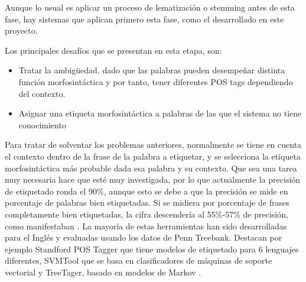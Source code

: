 Aunque lo usual es aplicar un proceso de lematización o stemming antes de esta fase, hay sistemas que aplican primero esta fase, como el desarrollado en este proyecto.\newline

Los principales desafíos que se presentan en esta etapa, son: 
\begin{itemize}
\item Tratar la ambigüedad, dado que las palabras pueden desempeñar distinta función morfosintáctica y por tanto, tener diferentes POS tags dependiendo del contexto. 
\item Asignar una etiqueta morfosintáctica a palabras de las que el sistema no tiene conocimiento
\end{itemize}  
Para tratar de solventar los problemas anteriores, normalmente se tiene en cuenta el contexto dentro de la frase de la palabra a etiquetar, y se selecciona la etiqueta morfosintáctica más probable dada esa palabra y su contexto. \newline
Que sea una tarea muy necesaria hace que esté muy investigada, por lo que actualmente la precisión de etiquetado ronda el 90\%, aunque esto se debe a que la precisión se mide en porcentaje de palabras bien etiquetadas. Si se midiera por porcentaje de frases completamente bien etiquetadas, la cifra descendería al 55\%-57\% de precisión, como manifestaban \citet{giesbrecht2009part}. \newline
La mayoría de estas herramientas han sido desarrolladas para el Inglés y evaluadas usando los datos de \textsf{Penn Treebank}. Destacan por ejemplo \textsf{Standford POS Tagger} que tiene modelos de etiquetado para 6 lenguajes diferentes, \textsf{SVMTool} \citet{gimenez2004svmtool} que se basa en clasificadores de máquinas de soporte vectorial  y \textsf{TreeTager}, basado en modelos de Markov \citet{schmid1995treetagger}. 
